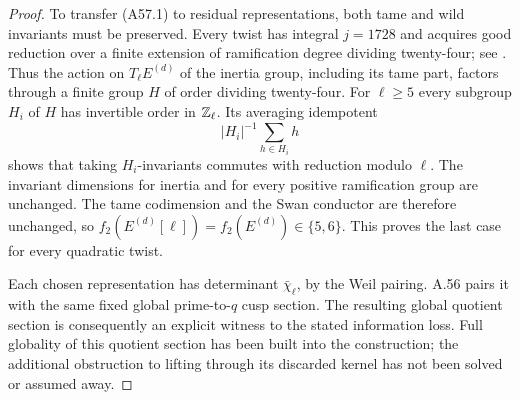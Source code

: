 \begin{proof}
To transfer (A57.1) to residual representations, both tame and wild
invariants must be preserved. Every twist has integral $j=1728$ and
acquires good reduction over a finite extension of ramification degree
dividing twenty-four; see \citet[\S7.1, before Lemma 7.1.3]{AMCDT1999}.
Thus the action on $T_\ell E^{(d)}$ of the inertia group, including
its tame part, factors through a finite group $H$ of order dividing
twenty-four. For $\ell\ge5$ every subgroup $H_i$ of $H$ has invertible
order in $\mathbb Z_\ell$. Its averaging idempotent
\[
 |H_i|^{-1}\sum_{h\in H_i}h
\]
shows that taking $H_i$-invariants commutes with reduction modulo
$\ell$. The invariant dimensions for inertia and for every positive
ramification group are unchanged. The tame codimension and the Swan
conductor are therefore unchanged, so
$f_2(E^{(d)}[\ell])=f_2(E^{(d)})\in\{5,6\}$. This proves the
last case for every quadratic twist.

Each chosen representation has determinant $\bar\chi_\ell$, by the
Weil pairing. A.56 pairs it with the same fixed global prime-to-$q$
cusp section. The resulting global quotient section is consequently
an explicit witness to the stated information loss. Full globality of
this quotient section has been built into the construction; the
additional obstruction to lifting through its discarded kernel has
not been solved or assumed away.


\end{proof}
